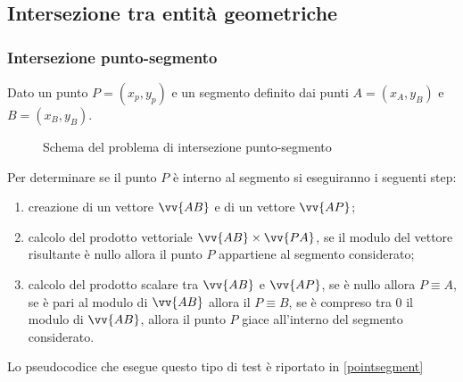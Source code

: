 \subsection{Intersezione tra entità geometriche}
%
\subsubsection{Intersezione punto-segmento}
\label{punto-segmento}
Dato un punto $P = (x_p, y_p)$ e un segmento definito dai punti $A = (x_A, y_B)$ e $B = (x_B, y_B)$.

\begin{figure}[h!]
	\centering
	\caption{Schema del problema di intersezione punto-segmento}
\end{figure}
\noindent
Per determinare se il punto $P$ è interno al segmento si eseguiranno i seguenti step:
\begin{enumerate}
	\item creazione di un vettore $\vv{AB}$ e di un vettore $\vv{AP}$;
	\item calcolo del prodotto vettoriale  $\vv{AB} \times  \vv{PA}$, se il modulo del vettore risultante è nullo allora il punto $P$ appartiene al segmento considerato;
	\item calcolo del prodotto scalare tra $\vv{AB}$ e $\vv{AP}$, se è nullo allora $P \equiv A$, se è pari al modulo di $\vv{AB}$ allora il $P \equiv B$, se è compreso tra 0 il modulo di $\vv{AB}$, allora il punto $P$ giace all'interno del segmento considerato.
\end{enumerate}
Lo pseudocodice che esegue questo tipo di test è riportato in \figurename{ \ref{pointsegment}}

